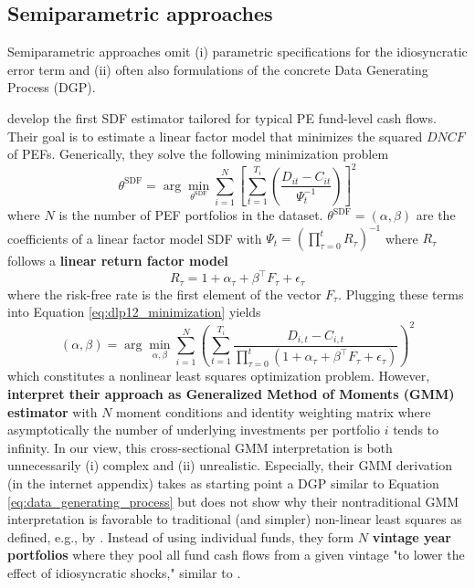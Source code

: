 \documentclass[12pt]{article}
\begin{document}
\subsection{Semiparametric approaches}

Semiparametric approaches omit (i) parametric specifications for the idiosyncratic error term and (ii) often also formulations of the concrete Data Generating Process (DGP).

\cite{DLP12} develop the first SDF estimator tailored for typical PE fund-level cash flows.
Their goal is to estimate a linear factor model that minimizes the squared $DNCF$ of PEFs.
Generically, they solve the following minimization problem
\begin{equation}
	\label{eq:dlp12_minimization}
	\theta^{\mathrm{SDF}} = 
	\arg \min_{\theta^{\mathrm{SDF}}} \sum_{i=1}^N 
	\left[ 
	\sum_{t=1}^{T_i}
	\left(
	\frac{D_{it} - C_{it}}{\Psi_{t}^{-1}}
	\right)
	\right]^2
\end{equation}
where $N$ is the number of PEF portfolios in the dataset.
$\theta^{\mathrm{SDF}}=(\alpha, \beta)$ are the coefficients of a linear factor model SDF with $\Psi_t=(\prod_{\tau=0}^t R_{\tau})^{-1}$ where $R_{\tau}$ follows a \textbf{linear return factor model}
\begin{equation}
	R_{\tau}=1+\alpha_{\tau}+\beta^{\top}F_{\tau}+\epsilon_{\tau}
\end{equation}
where the risk-free rate is the first element of the vector $F_{\tau}$.
Plugging these terms into Equation \ref{eq:dlp12_minimization} yields
\[
\left( \alpha, \beta \right) 
= 
\arg \min_{\alpha, \beta} 
\sum_{i=1}^N 
\left( 
\sum_{t=1}^{T_i}
\frac{D_{i,t} - C_{i,t}}{\prod_{\tau=0}^t (1 + \alpha_{\tau}+\beta^{\top}F_{\tau}+\epsilon_{\tau}) } 
\right)^2
\]
which constitutes a nonlinear least squares optimization problem.
However, \cite{DLP12} \textbf{interpret their approach as Generalized Method of Moments (GMM) estimator} with $N$ moment conditions and identity weighting matrix where asymptotically the number of underlying investments per portfolio $i$ tends to infinity.
In our view, this cross-sectional GMM interpretation is both unnecessarily (i) complex and (ii) unrealistic.
Especially, their GMM derivation (in the internet appendix) takes as starting point a DGP similar to Equation \ref{eq:data_generating_process} but does not show why their nontraditional GMM interpretation is favorable to traditional (and simpler) non-linear least squares as defined, e.g., by \cite{PP97}.
Instead of using individual funds, they form $N$ \textbf{vintage year portfolios} where they pool all fund cash flows from a given vintage "to lower the effect of idiosyncratic shocks," similar to \cite{FNP12}.
\end{document}
